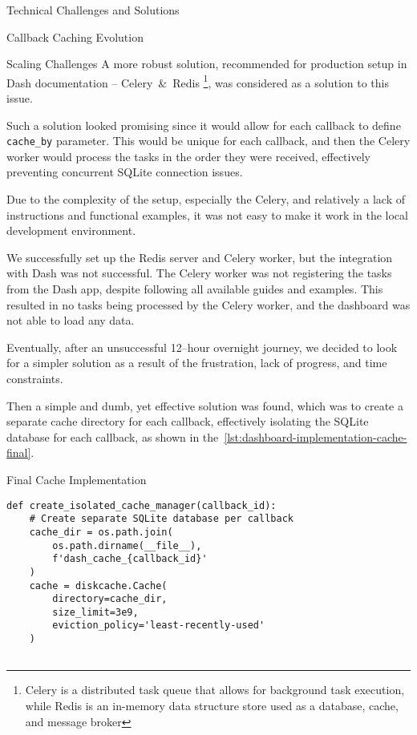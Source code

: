\begin{section}{Technical Challenges and Solutions}
\begin{subsection}{Callback Caching Evolution}
\begin{subsubsection}{Scaling Challenges}
			A more robust solution, recommended for production setup in Dash documentation – Celery~\&~Redis
			\footnote{Celery is a distributed task queue that allows for background task execution, while Redis is an in-memory data structure store used as a database, cache, and message broker\cite{reintech_blog_combining_celery_redis_caching_task_queuing}\cite{celery_getting_started_introduction}\cite{redis_latest}},
			was considered as a solution to this issue.

			Such a solution looked promising since it would allow for each callback to define \texttt{cache\_by} parameter.
			This would be unique for each callback, and then the Celery worker would process the tasks in the order they were received, effectively preventing concurrent SQLite connection issues.

			Due to the complexity of the setup, especially the Celery, and relatively a lack of instructions and functional examples, it was not easy to make it work in the local development environment.

			We successfully set up the Redis server and Celery worker, but the integration with Dash was not successful.
			The Celery worker was not registering the tasks from the Dash app, despite following all available guides and examples.
			This resulted in no tasks being processed by the Celery worker, and the dashboard was not able to load any data.

			Eventually, after an unsuccessful 12–hour overnight journey, we decided to look for a simpler solution as a result of the frustration, lack of progress, and time constraints.

			Then a simple and dumb, yet effective solution was found, which was to create a separate cache directory for each callback,
			effectively isolating the SQLite database for each callback, as shown in the~\autoref{lst:dashboard-implementation-cache-final}.

			\vspace*{\fill}\pagebreak[4] %

			\begin{listing}[H]
				\caption{Final Cache Implementation}
				\begin{verbatim}
def create_isolated_cache_manager(callback_id):
    # Create separate SQLite database per callback
    cache_dir = os.path.join(
        os.path.dirname(__file__),
        f'dash_cache_{callback_id}'
    )
    cache = diskcache.Cache(
        directory=cache_dir,
        size_limit=3e9,
        eviction_policy='least-recently-used'
    )


\end{verbatim}
\end{listing}
\end{subsubsection}
\end{subsection}
\end{section}

